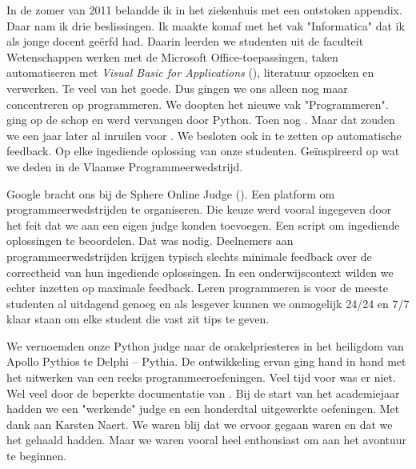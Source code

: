 
In de zomer van 2011 belandde ik in het ziekenhuis met een ontstoken appendix.
Daar nam ik drie beslissingen.
Ik maakte komaf met het vak "Informatica" dat ik als jonge docent geërfd had.
Daarin leerden we studenten uit de faculteit Wetenschappen werken met de Microsoft Office-toepassingen, taken automatiseren met \emph{Visual Basic for Applications} (), literatuur opzoeken en verwerken.
Te veel van het goede.
Dus gingen we ons alleen nog maar concentreren op programmeren.
We doopten het nieuwe vak "Programmeren".
 ging op de schop en werd vervangen door Python.
Toen nog .
Maar dat zouden we een jaar later al inruilen voor .
We besloten ook in te zetten op automatische feedback.
Op elke ingediende oplossing van onze studenten.
Geïnspireerd op wat we deden in de Vlaamse Programmeerwedstrijd.

Google bracht ons bij de Sphere Online Judge ().
Een platform om programmeerwedstrijden te organiseren.
Die keuze werd vooral ingegeven door het feit dat we aan  een eigen judge konden toevoegen.
Een script om ingediende oplossingen te beoordelen.
Dat was nodig.
Deelnemers aan programmeerwedstrijden krijgen typisch slechts minimale feedback over de correctheid van hun ingediende oplossingen.
In een onderwijscontext wilden we echter inzetten op maximale feedback.
Leren programmeren is voor de meeste studenten al uitdagend genoeg en als lesgever kunnen we onmogelijk 24/24 en 7/7 klaar staan om elke student die vast zit tips te geven.

We vernoemden onze Python judge naar de orakelpriesteres in het heiligdom van Apollo Pythios te Delphi -- Pythia.
De ontwikkeling ervan ging hand in hand met het uitwerken van een reeks programmeeroefeningen.
Veel tijd voor  was er niet.
Wel veel  door de beperkte documentatie van .
Bij de start van het academiejaar hadden we een "werkende" judge en een honderdtal uitgewerkte oefeningen.
Met dank aan Karsten Naert.
We waren blij dat we ervoor gegaan waren en dat we het gehaald hadden.
Maar we waren vooral heel enthousiast om aan het avontuur te beginnen.


